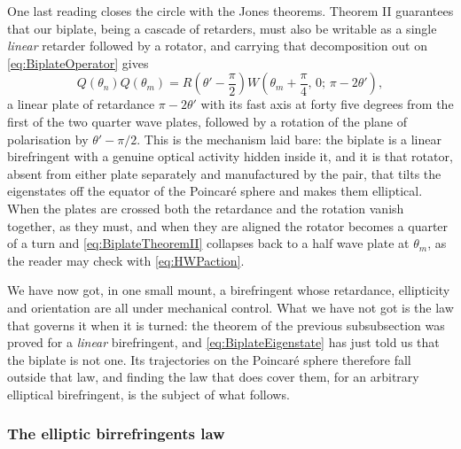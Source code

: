             One last reading closes the circle with the Jones theorems. Theorem II guarantees that our biplate, being a cascade of retarders, must also be writable as a single \textit{linear} retarder followed by a rotator, and carrying that decomposition out on \ref{eq:BiplateOperator} gives
            \begin{equation}\label{eq:BiplateTheoremII}
                Q(\theta_n)Q(\theta_m) = R\left(\theta'-\frac{\pi}{2}\right)W\left(\theta_m+\frac{\pi}{4},\,0;\,\pi-2\theta'\right),
            \end{equation}
            a linear plate of retardance $\pi-2\theta'$ with its fast axis at forty five degrees from the first of the two quarter wave plates, followed by a rotation of the plane of polarisation by $\theta'-\pi/2$. This is the mechanism laid bare: the biplate is a linear birefringent with a genuine optical activity hidden inside it, and it is that rotator, absent from either plate separately and manufactured by the pair, that tilts the eigenstates off the equator of the Poincaré sphere and makes them elliptical. When the plates are crossed both the retardance and the rotation vanish together, as they must, and when they are aligned the rotator becomes a quarter of a turn and \ref{eq:BiplateTheoremII} collapses back to a half wave plate at $\theta_m$, as the reader may check with \ref{eq:HWPaction}.

            We have now got, in one small mount, a birefringent whose retardance, ellipticity and orientation are all under mechanical control. What we have not got is the law that governs it when it is turned: the theorem of the previous subsubsection was proved for a \textit{linear} birefringent, and \ref{eq:BiplateEigenstate} has just told us that the biplate is not one. Its trajectories on the Poincaré sphere therefore fall outside that law, and finding the law that does cover them, for an arbitrary elliptical birefringent, is the subject of what follows.

        \subsubsection{The elliptic birrefringents law}

